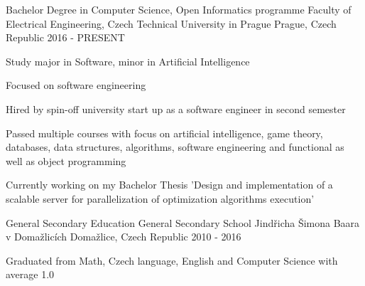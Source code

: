 


\begin{cventries}
	\cventry
	{Bachelor Degree in Computer Science, Open Informatics programme} %
	{Faculty of Electrical Engineering, Czech Technical University in Prague} %
	{Prague, Czech Republic} %
	{2016 - PRESENT} %
	{ %
		\begin{cvitems}
			\item {Study major in Software, minor in Artificial Intelligence}
			\item {Focused on software engineering}
			\item {Hired by spin-off university start up as a software engineer in second semester}
			\item {Passed multiple courses with focus on artificial intelligence, game theory, databases,
			 data structures, algorithms, software engineering and functional as well as object programming}
			 \item {Currently working on my Bachelor Thesis 'Design and implementation of a scalable server for parallelization of optimization algorithms execution'}
		\end{cvitems}
	}
		
		
	\cventry
	{General Secondary Education} %
	{General Secondary School Jindřicha Šimona Baara v Domažlicích} %
	{Domažlice, Czech Republic} %
	{2010 - 2016} %
	{ %
		\begin{cvitems}
			\item {Graduated from Math, Czech language, English and Computer Science with average 1.0}
		\end{cvitems}
	}
	
\end{cventries}